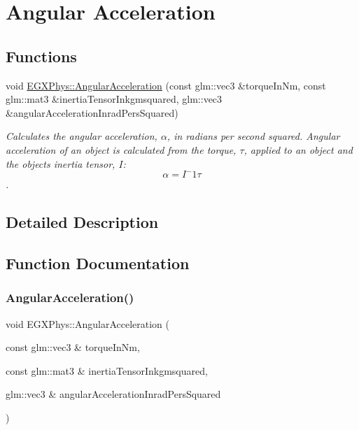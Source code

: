\hypertarget{group___e_g_x_phys-_kinetics-_angular_acceleration}{}\section{Angular Acceleration}
\label{group___e_g_x_phys-_kinetics-_angular_acceleration}
\subsection*{Functions}
\begin{DoxyCompactItemize}
\item 
void \mbox{\hyperlink{group___e_g_x_phys-_kinetics-_angular_acceleration_gaf636e9a30f3db4e170829efbf40efbbe}{E\+G\+X\+Phys\+::\+Angular\+Acceleration}} (const glm\+::vec3 \&torque\+In\+Nm, const glm\+::mat3 \&inertia\+Tensor\+Inkgmsquared, glm\+::vec3 \&angular\+Acceleration\+Inrad\+Pers\+Squared)
\begin{DoxyCompactList}\small\item\em Calculates the angular acceleration, $\alpha$, in radians per second squared. Angular acceleration of an object is calculated from the torque, $\tau$, applied to an object and the object\textquotesingle{}s inertia tensor, $I$\+: \[\alpha=I^-1 \tau \]. \end{DoxyCompactList}\end{DoxyCompactItemize}


\subsection{Detailed Description}


\subsection{Function Documentation}
\mbox{\label{group___e_g_x_phys-_kinetics-_angular_acceleration_gaf636e9a30f3db4e170829efbf40efbbe}} 
\subsubsection{\texorpdfstring{Angular\+Acceleration()}{AngularAcceleration()}}
{\footnotesize\ttfamily void E\+G\+X\+Phys\+::\+Angular\+Acceleration (\begin{DoxyParamCaption}\item[{const glm\+::vec3 \&}]{torque\+In\+Nm,  }\item[{const glm\+::mat3 \&}]{inertia\+Tensor\+Inkgmsquared,  }\item[{glm\+::vec3 \&}]{angular\+Acceleration\+Inrad\+Pers\+Squared }\end{DoxyParamCaption})}



